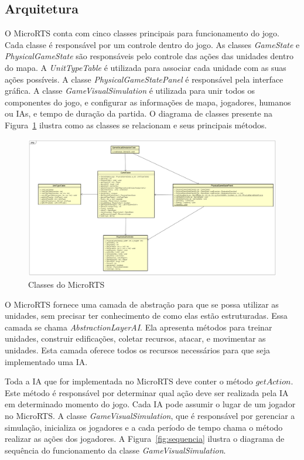 \subsection{Arquitetura}

O MicroRTS conta com cinco classes principais para funcionamento do jogo. 
Cada classe é responsável por um controle dentro do jogo.
As classes \textit{GameState} e \textit{PhysicalGameState} são responsáveis pelo controle das ações das unidades dentro do mapa.
A \textit{UnitTypeTable} é utilizada para associar cada unidade com as suas ações possíveis.
A classe \textit{PhysicalGameStatePanel} é responsável pela interface gráfica.
A classe \textit{GameVisualSimulation} é utilizada para unir todos os componentes do jogo, e configurar as informações de mapa, jogadores, humanos ou IAs, e tempo de duração da partida.
O diagrama de classes presente na Figura~\ref{fig:classes} ilustra como as classes se relacionam e seus principais métodos.

\begin{figure}[ht]
	\centering
	\includegraphics[width=1\textwidth]{fig/classes.png}
	\caption{Classes do MicroRTS}
	\label{fig:classes}
\end{figure} 

O MicroRTS fornece uma camada de abstração para que se possa utilizar as unidades, sem precisar ter conhecimento de como elas estão estruturadas. 
Essa camada se chama \textit{AbstractionLayerAI}. 
Ela apresenta métodos para treinar unidades, construir edificações, coletar recursos, atacar, e movimentar as unidades. 
Esta camada oferece todos os recursos necessários para que seja implementado uma IA.

Toda a IA que for implementada no MicroRTS deve conter o método $\mathit{getAction}$.
Este método é responsável por determinar qual ação deve ser realizada pela IA em determinado momento do jogo.
Cada IA pode assumir o lugar de um jogador no MicroRTS. 
A classe \textit{GameVisualSimulation}, que é responsável por gerenciar a simulação, inicializa os jogadores e a cada período de tempo chama o método realizar as ações dos jogadores.
A Figura~\ref{fig:sequencia} ilustra o diagrama de sequência do funcionamento da classe \textit{GameVisualSimulation}. 

